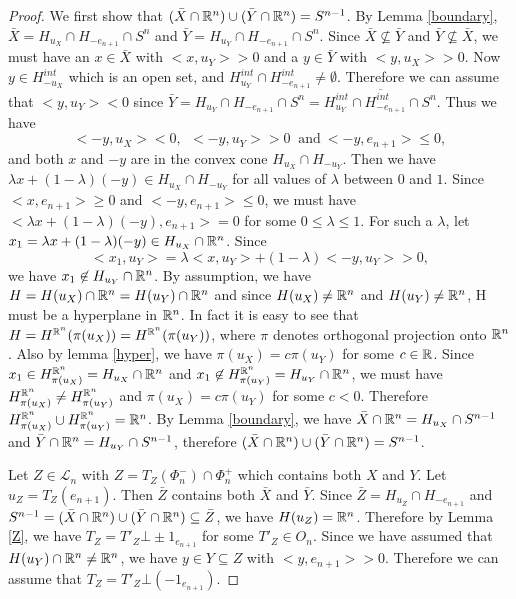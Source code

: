 \documentclass[psamsfonts]{amsart}
\numberwithin{equation}{subsection}
\theoremstyle{plain}
\theoremstyle{definition}
\theoremstyle{remark}
\begin{document}
\begin{proof}
We first show that $(\bar{X} \cap \Bbb{R}^n) \cup (\bar{Y} \cap \Bbb{R}^n)  = S^{n - 1}$. 
By Lemma  \ref{boundary}, $\bar{X} = H_{u_X} \cap H_{-e_{n + 1}}\cap S^n$ and $\bar{Y} = H_{u_Y} \cap H_{-e_{n + 1}}\cap S^n$. Since $\bar{X} \not\subseteq \bar{Y}$ and $\bar{Y} \not\subseteq \bar{X}$, we must have 
an $x \in \bar{X}$ with $<x, u_Y>  > 0$ and a $y \in \bar{Y}$ with $<y, u_X>  > 0$. Now  $y \in H_{-u_X}^{int}$ which is an open set,
and $H_{u_Y}^{int} \cap H_{-e_{n + 1}}^{int} \not= \emptyset$. Therefore 
we can assume that $<y, u_Y> < 0$ since 
 $ \bar{Y} = H_{u_Y} \cap H_{-e_{n + 1}}\cap S^n  = \overline{H_{u_Y}^{int} \cap H_{-e_{n + 1}}^{int} \cap S^n}$. 
Thus we have 
$$<-y, u_X>  < 0,  \ \ <-y, u_Y>  > 0\ \mbox{ and} \ <-y, e_{n + 1}>  \leq 0,$$
 and  both $x$ and $-y$ are in the convex cone $ H_{u_X} \cap H_{-u_Y}$. Then we have $\lambda x + (1 - \lambda)(-y) \in 
H_{u_X} \cap H_{-u_Y}$ for all values of $\lambda$ between $0$ and $1$. Since 
$<x, e_{n + 1}> \geq 0$ and $<-y, e_{n + 1}> \leq  0$, we must have $<\lambda x + (1 - \lambda)(-y), e_{n + 1}> = 0$
for some $0 \leq \lambda \leq 1$. For such a $\lambda$, let 
$x_1 = \lambda x + (1 - \lambda)(-y) \in H_{u_X} \cap \Bbb{R}^n$. Since  
$$<x_1, u_Y> = \lambda<x, u_Y> + (1 - \lambda)<-y, u_Y>  > 0,$$
 we have $x_1 \not\in H_{u_Y} \cap \Bbb{R}^n$.  
By assumption, we have $H = H(u_X) \cap \Bbb{R}^{n} = H(u_Y) \cap \Bbb{R}^{n}$ and since $H(u_X) \not= \Bbb{R}^{n}$ and 
$H(u_Y) \not= \Bbb{R}^{n}$, H must be a hyperplane in $\Bbb{R}^{n}$. In fact it is easy to see that $H = H^{\Bbb{R}^n}(\pi(u_X)) = H^{\Bbb{R}^n}(\pi(u_Y))$, where $\pi$ denotes orthogonal projection onto $\Bbb{R}^n$. 
Also by lemma \ref{hyper}, we have $\pi(u_X) = c\pi(u_Y)$ for some $c \in \Bbb{R}$.  Since $x_1 \in 
H^{\Bbb{R}^n}_{\pi(u_X)} = H_{u_X} \cap \Bbb{R}^n$ and $x_1 \not\in H^{\Bbb{R}^n}_{\pi(u_Y)} =  H_{u_Y} \cap \Bbb{R}^n$, we  must have $H^{\Bbb{R}^n}_{\pi(u_X)} \not= H^{\Bbb{R}^n}_{\pi(u_Y)}$ and $\pi(u_X) = c\pi(u_Y)$ for some $c < 0$. Therefore
$H^{\Bbb{R}^n}_{\pi(u_X)} \cup H^{\Bbb{R}^n}_{\pi(u_Y)} = \Bbb{R}^n$. 
By Lemma \ref{boundary}, we have $\bar{X} \cap \Bbb{R}^n = H_{u_X} \cap S^{n-1}$ and $\bar{Y} \cap \Bbb{R}^n = H_{u_Y} \cap S^{n-1}$, therefore $(\bar{X} \cap \Bbb{R}^n) \cup (\bar{Y} \cap \Bbb{R}^n)  = S^{n - 1}$.



Let  $Z \in \mathcal{L}_n$ with $Z = T_Z(\Phi_n^-)\cap \Phi^+_n$   which contains both $X$ and $Y$. Let 
$u_Z = T_Z(e_{n + 1})$.  Then $\bar{Z}$ contains both $\bar{X}$ and $\bar{Y}$. 
Since $\bar{Z} = H_{u_Z} \cap H_{-e_{n + 1}}$ and $S^{n - 1} = (\bar{X} \cap \Bbb{R}^n) \cup (\bar{Y} \cap \Bbb{R}^n) \subseteq \bar{Z}$, we  have $H({u_Z)} = \Bbb{R}^n$. Therefore by Lemma \ref{Z}, we have 
$T_Z = T'_Z \bot \pm 1_{e_{n + 1}}$ for some $T'_Z \in O_n$.
 Since we have assumed that $H(u_Y) \cap \Bbb{R}^{n} \not= \Bbb{R}^{n}$, we have $y \in Y \subseteq Z$ with $<y, e_{n + 1}> > 0$. Therefore we can assume that 
$T_Z = T'_Z \bot ( -1_{e_{n + 1}})$. 


\end{proof}
\end{document}
